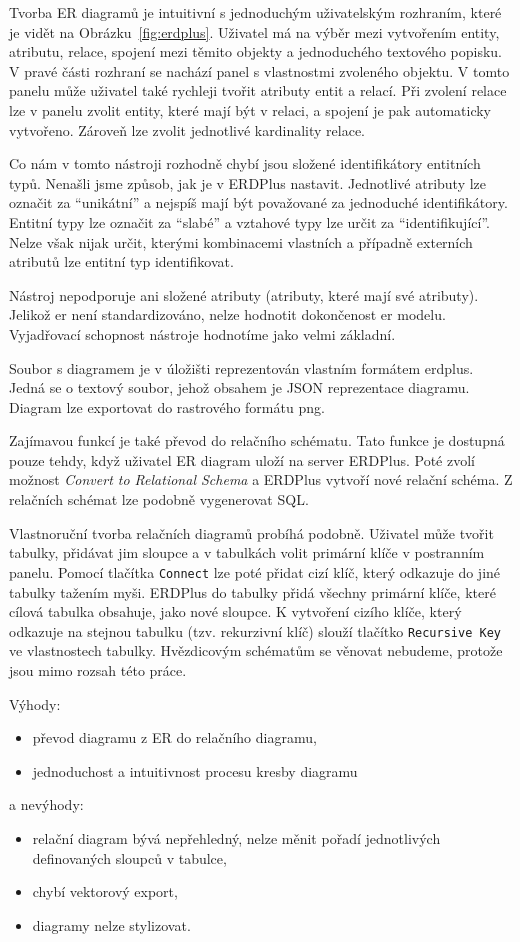 Tvorba ER diagramů je intuitivní s jednoduchým uživatelským rozhraním, které je vidět na Obrázku~\ref{fig:erdplus}.
Uživatel má na výběr mezi vytvořením entity, atributu, relace, spojení mezi těmito objekty a jednoduchého textového popisku.
V pravé části rozhraní se nachází panel s vlastnostmi zvoleného objektu.
V tomto panelu může uživatel také rychleji tvořit atributy entit a relací.
Při zvolení relace lze v panelu zvolit entity, které mají být v relaci, a spojení je pak automaticky vytvořeno.
Zároveň lze zvolit jednotlivé kardinality relace.

Co nám v tomto nástroji rozhodně chybí jsou složené identifikátory entitních typů.
Nenašli jsme způsob, jak je v ERDPlus nastavit.
Jednotlivé atributy lze označit za \enquote{unikátní} a nejspíš mají být považované za jednoduché identifikátory.
Entitní typy lze označit za \enquote{slabé} a vztahové typy lze určit za \enquote{identifikující}.
Nelze však nijak určit, kterými kombinacemi vlastních a případně externích atributů lze entitní typ identifikovat.

Nástroj nepodporuje ani složené atributy (atributy, které mají své atributy).
Jelikož \acrshort{er} není standardizováno, nelze hodnotit dokončenost \acrshort{er} modelu.
Vyjadřovací schopnost nástroje hodnotíme jako velmi základní.

Soubor s diagramem je v úložišti reprezentován vlastním formátem erdplus.
Jedná se o textový soubor, jehož obsahem je JSON reprezentace diagramu.
Diagram lze exportovat do rastrového formátu \acrshort{png}.

Zajímavou funkcí je také převod do relačního schématu.
Tato funkce je dostupná pouze tehdy, když uživatel ER diagram uloží na server ERDPlus.
Poté zvolí možnost \emph{Convert to Relational Schema} a ERDPlus vytvoří nové relační schéma.
Z relačních schémat lze podobně vygenerovat SQL.

Vlastnoruční tvorba relačních diagramů probíhá podobně.
Uživatel může tvořit tabulky, přidávat jim sloupce a v tabulkách volit primární klíče v postranním panelu.
Pomocí tlačítka \texttt{Connect} lze poté přidat cizí klíč, který odkazuje do jiné tabulky tažením myši.
ERDPlus do tabulky přidá všechny primární klíče, které cílová tabulka obsahuje, jako nové sloupce.
K vytvoření cizího klíče, který odkazuje na stejnou tabulku (tzv. rekurzivní klíč) slouží tlačítko \texttt{Recursive Key} ve vlastnostech tabulky.
Hvězdicovým schématům se věnovat nebudeme, protože jsou mimo rozsah této práce.

Výhody:
\begin{itemize}
  \item převod diagramu z ER do relačního diagramu,
  \item jednoduchost a intuitivnost procesu kresby diagramu
\end{itemize}
a nevýhody:
\begin{itemize}
  \item relační diagram bývá nepřehledný, nelze měnit pořadí jednotlivých definovaných sloupců v tabulce,
  \item chybí vektorový export,
  \item diagramy nelze stylizovat.
\end{itemize}

